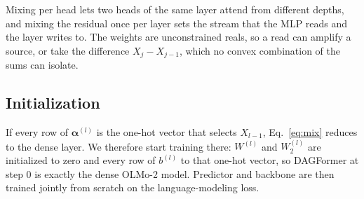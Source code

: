 \documentclass[11pt]{article}
\newcommand{\dagf}{DAGFormer}
\newcommand{\valpha}{\boldsymbol{\alpha}}
\begin{document}
Mixing per head lets two heads of the same layer attend from different depths, and mixing the residual once per layer sets the stream that the MLP reads and the layer writes to. The weights are unconstrained reals, so a read can amplify a source, or take the difference $X_j - X_{j-1}$, which no convex combination of the sums can isolate.

\subsection{Initialization}
\label{sec:init}

If every row of $\valpha^{(l)}$ is the one-hot vector that selects $X_{l-1}$, Eq.~\ref{eq:mix} reduces to the dense layer. We therefore start training there: $W^{(l)}$ and $W_2^{(l)}$ are initialized to zero and every row of $b^{(l)}$ to that one-hot vector, so \dagf{} at step 0 is exactly the dense OLMo-2 model. Predictor and backbone are then trained jointly from scratch on the language-modeling loss.
\end{document}
